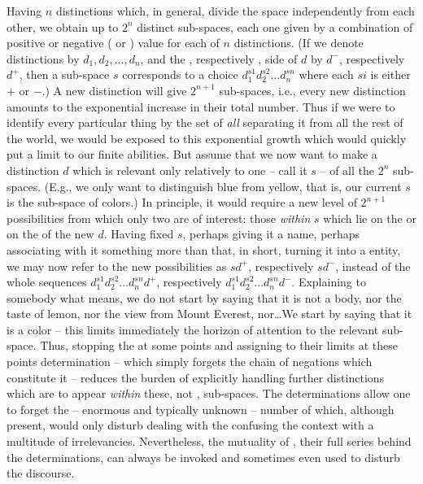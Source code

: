 Having $n$ distinctions which, in general, divide the space independently from
each other, we obtain up to $2^n$ distinct sub-spaces, each one given by a
combination of positive or negative ( or ) value for each
of $n$ distinctions. (If we denote distinctions by
$d_1,d_2,\ldots,d_n$, and the , respectively , side of $d$
by $d^-$, respectively $d^+$, then a sub-space $s$ corresponds to a choice
$d_1^{s1}d_2^{s2}\ldots d_n^{sn}$ where each $si$ is either $+$ or $-$.) A new
distinction will give $2^{n+1}$ sub-spaces, i.e., every new distinction amounts
to the exponential increase in their total number. Thus if we were to identify
every particular thing by the set of {\em all}  separating it
from all the rest of the world, we would be exposed to this exponential growth
which would quickly put a limit to our finite abilities.
But assume that we now want to make a distinction $d$ which is relevant only
relatively to one -- call it $s$ -- of all the $2^n$ sub-spaces. (E.g., we only
want to distinguish blue from yellow, that is, our current $s$ is the sub-space
of colors.) In principle, it would require a new level of $2^{n+1}$
possibilities from which only two are of interest: those {\em within} $s$ which
lie on the  or on the  of the new $d$. Having fixed $s$,
perhaps giving it a name, perhaps associating with it something more than that,
in short, turning it into a  entity, we may now refer to the new
possibilities as $sd^+$, respectively $sd^-$, instead of the whole sequences
$d_1^{s1}d_2^{s2}\ldots d_n^{sn}d^+$, respectively $d_1^{s1}d_2^{s2}\ldots 
d_n^{sn}d^-$.  Explaining to somebody what  means, we do not start by
saying that it is not a body, nor the taste of lemon, nor the view from Mount
Everest, nor\ldots We start by saying that it is a color -- this limits
immediately the horizon of attention to the relevant sub-space.  Thus, stopping the
 at some points and assigning to their limits at these points
 determination -- which simply forgets the chain of negations
which constitute it -- reduces the burden of explicitly handling further
{distinctions} which are to appear {\em within} these, not ,
sub-spaces.  The  determinations allow one to forget the --
enormous and typically  unknown -- number of 
which, although present, would only disturb dealing with the 
confusing the context with a multitude of irrelevancies. Nevertheless, the
mutuality of , their full series behind the 
determinations, can always be invoked and sometimes even used to disturb the
discourse.

